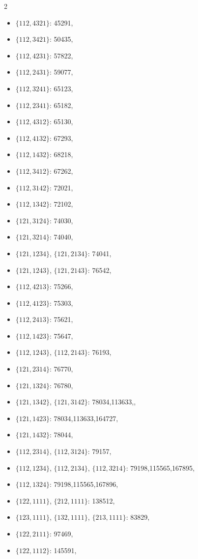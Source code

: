 \documentclass[11pt]{amsart}
\theoremstyle{plain}
\theoremstyle{definition}
\begin{document}
{\begin{multicols}{2}
\begin{itemize}
\item $\{112,4321\}$: 45291,
\item $\{112,3421\}$: 50435,
\item $\{112,4231\}$: 57822,
\item $\{112,2431\}$: 59077,
\item $\{112,3241\}$: 65123,
\item $\{112,2341\}$: 65182,
\item $\{112,4312\}$: 65130,
\item $\{112,4132\}$: 67293,
\item $\{112,1432\}$: 68218,
\item $\{112,3412\}$: 67262,
\item $\{112,3142\}$: 72021,
\item $\{112,1342\}$: 72102,
\item $\{121,3124\}$: 74030,
\item $\{121,3214\}$: 74040,
\item[$\blacksquare$] {$\{121,1234\}$, $\{121,2134\}$}: 74041,
\item[$\blacksquare$] {$\{121,1243\}$, $\{121,2143\}$}: 76542,
\item $\{112,4213\}$: 75266,
\item $\{112,4123\}$: 75303,
\item $\{112,2413\}$: 75621,
\item $\{112,1423\}$: 75647,
\item[$\blacksquare$] {$\{112,1243\}$, $\{112,2143\}$}: 76193,
\item $\{121,2314\}$: 76770,
\item $\{121,1324\}$: 76780,
\item[$\blacksquare$] $\{121,1342\}$, $\{121,3142\}$: 78034,113633,,
\item $\{121,1423\}$: 78034,113633,164727,
\item $\{121,1432\}$: 78044,
\item[$\blacksquare$] $\{112,2314\}$, $\{112,3124\}$: 79157,
\item[$\blacksquare$] $\{112,1234\}$, $\{112,2134\}$, $\{112,3214\}$: 79198,115565,167895,
\item $\{112,1324\}$: 79198,115565,167896,
\item[$\blacksquare$] {$\{122,1111\}$, $\{212,1111\}$}: 138512,
\item[$\blacksquare$] {$\{123,1111\}$, $\{132,1111\}$, $\{213,1111\}$}: 83829,
\item $\{122,2111\}$: 97469,
\item $\{122,1112\}$: 145591,

\end{itemize}
\end{multicols}}
\end{document}
